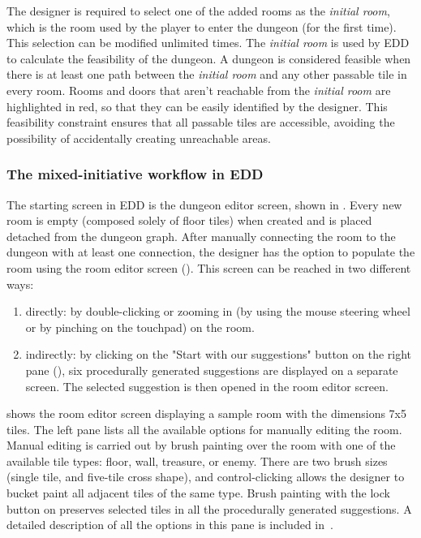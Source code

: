 The designer is required to select one of the added rooms as the \textit{initial room}, which is the room used by the player to enter the dungeon (for the first time). This selection can be modified unlimited times. The \textit{initial room} is used by EDD to calculate the feasibility of the dungeon. A dungeon is considered feasible when there is at least one path between the \textit{initial room} and any other passable tile in every room. Rooms and doors that aren't reachable from the \textit{initial room} are highlighted in red, so that they can be easily identified by the designer. This feasibility constraint ensures that all passable tiles are accessible, avoiding the possibility of accidentally creating unreachable areas.  

\subsubsection{The mixed-initiative workflow in EDD}

The starting screen in EDD is the dungeon editor screen, shown in . Every new room is empty (composed solely of floor tiles) when created and is placed detached from the dungeon graph. After manually connecting the room to the dungeon with at least one connection, the designer has the option to populate the room using the room editor screen (). This screen can be reached in two different ways:

\begin{enumerate}
\setcounter{enumi}{0}
\item directly: by double-clicking or zooming in (by using the mouse steering wheel or by pinching on the touchpad) on the room. 
\item indirectly: by clicking on the "Start with our suggestions" button on the right pane (), six procedurally generated suggestions are displayed on a separate screen. The selected suggestion is then opened in the room editor screen. 
\end{enumerate}

 shows the room editor screen displaying a sample room with the dimensions 7x5 tiles. The left pane lists all the available options for manually editing the room. Manual editing is carried out by brush painting over the room with one of the available tile types: floor, wall, treasure, or enemy. There are two brush sizes (single tile, and five-tile cross shape), and control-clicking allows the designer to bucket paint all adjacent tiles of the same type. Brush painting with the lock button on preserves selected tiles in all the procedurally generated suggestions. A detailed description of all the options in this pane is included in~.

